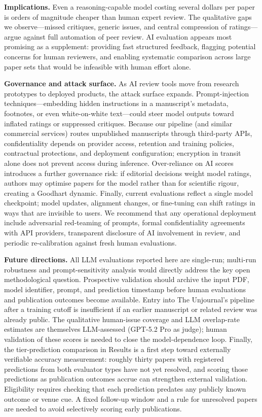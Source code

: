 \documentclass[
  11pt,
  letterpaper,
]{article}
\begin{document}
\textbf{Implications.} Even a reasoning-capable model costing several
dollars per paper is orders of magnitude cheaper than human expert
review. The qualitative gaps we observe---missed critiques, generic
issues, and central compression of ratings---argue against full
automation of peer review. AI evaluation appears most promising as a
supplement: providing fast structured feedback, flagging potential
concerns for human reviewers, and enabling systematic comparison across
large paper sets that would be infeasible with human effort alone.

\textbf{Governance and attack surface.} As AI review tools move from
research prototypes to deployed products, the attack surface expands.
Prompt-injection techniques---embedding hidden instructions in a
manuscript's metadata, footnotes, or even white-on-white text---could
steer model outputs toward inflated ratings or suppressed critiques.
Because our pipeline (and similar commercial services) routes
unpublished manuscripts through third-party APIs, confidentiality
depends on provider access, retention and training policies, contractual
protections, and deployment configuration; encryption in transit alone
does not prevent access during inference. Over-reliance on AI scores
introduces a further governance risk: if editorial decisions weight
model ratings, authors may optimise papers for the model rather than for
scientific rigour, creating a Goodhart dynamic. Finally, current
evaluations reflect a single model checkpoint; model updates, alignment
changes, or fine-tuning can shift ratings in ways that are invisible to
users. We recommend that any operational deployment include adversarial
red-teaming of prompts, formal confidentiality agreements with API
providers, transparent disclosure of AI involvement in review, and
periodic re-calibration against fresh human evaluations.

\textbf{Future directions.} All LLM evaluations reported here are
single-run; multi-run robustness and prompt-sensitivity analysis would
directly address the key open methodological question. Prospective
validation should archive the input PDF, model identifier, prompt, and
prediction timestamp before human evaluations and publication outcomes
become available. Entry into The Unjournal's pipeline after a training
cutoff is insufficient if an earlier manuscript or related review was
already public. The qualitative human-issue coverage and LLM
overlap-rate estimates are themselves LLM-assessed (GPT-5.2 Pro as
judge); human validation of these scores is needed to close the
model-dependence loop. Finally, the tier-prediction comparison in
Results is a first step toward externally verifiable accuracy
measurement: roughly thirty papers with registered predictions from both
evaluator types have not yet resolved, and scoring those predictions as
publication outcomes accrue can strengthen external validation.
Eligibility requires checking that each prediction predates any publicly
known outcome or venue cue. A fixed follow-up window and a rule for
unresolved papers are needed to avoid selectively scoring early
publications.
\end{document}
